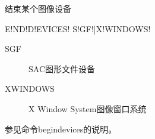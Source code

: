 \label{cmd:enddevices}

结束某个图像设备

\begin{SACSTX}
E!ND!D!EVICES! S!GF!|X!WINDOWS!
\end{SACSTX}

\begin{description}
\item [SGF] SAC图形文件设备
\item [XWINDOWS] X Window System图像窗口系统
\end{description}

参见命令begindevices的说明。

